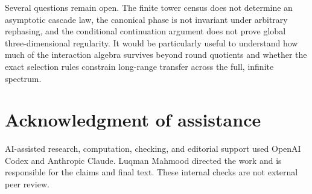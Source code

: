 \documentclass[12pt]{article}
\theoremstyle{definition}
\theoremstyle{remark}
\begin{document}
Several questions remain open.  The finite tower census does not determine an
asymptotic cascade law, the canonical phase is not invariant under arbitrary
rephasing, and the conditional continuation argument does not prove global
three-dimensional regularity.  It would be particularly useful to understand
how much of the interaction algebra survives beyond round quotients and
whether the exact selection rules constrain long-range transfer across the
full, infinite spectrum.

\section*{Acknowledgment of assistance}
AI-assisted research, computation, checking, and editorial support used
OpenAI Codex and Anthropic Claude. Luqman Mahmood directed the work
and is responsible for the claims and final text. These internal
checks are not external peer review.

\begingroup
\footnotesize


\endgroup
\end{document}
